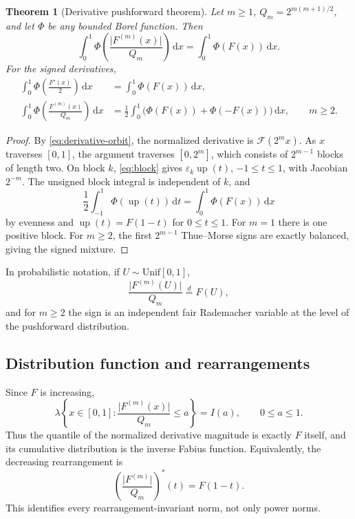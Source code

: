 \documentclass[11pt]{article}
\newtheorem{theorem}{Theorem}[section]
\theoremstyle{definition}
\theoremstyle{remark}
\DeclareMathOperator{\upf}{up}
\newcommand{\dd}{\,\mathrm d}
\newcommand{\FF}{\mathscr F}
\newcommand{\eps}{\varepsilon}
\newcommand{\abs}[1]{\lvert#1\rvert}
\newcommand{\set}[1]{\left\{#1\right\}}
\begin{document}
\begin{theorem}[Derivative pushforward theorem]
\label{thm:pushforward}
Let \(m\ge1\), \(Q_m=2^{m(m+1)/2}\), and let \(\Phi\) be any bounded Borel function.
Then
\begin{equation}
 \boxed{
 \int_0^1\Phi\!\left(\frac{\abs{F^{(m)}(x)}}{Q_m}\right)\dd x
 =\int_0^1\Phi(F(x))\dd x.
 }                                                        \label{eq:absolute-pushforward}
\end{equation}
For the signed derivatives,
\begin{align}
 \int_0^1\Phi\!\left(\frac{F'(x)}2\right)\dd x
 &=\int_0^1\Phi(F(x))\dd x,                              \label{eq:m1-pushforward}\\
 \int_0^1\Phi\!\left(\frac{F^{(m)}(x)}{Q_m}\right)\dd x
 &=\frac12\int_0^1\bigl(\Phi(F(x))+\Phi(-F(x))\bigr)\dd x,
 \qquad m\ge2.                                           \label{eq:signed-pushforward}
\end{align}
\end{theorem}

\begin{proof}
By \eqref{eq:derivative-orbit}, the normalized derivative is \(\FF(2^mx)\).  As
\(x\) traverses \([0,1]\), the argument traverses \([0,2^m]\), which consists of
\(2^{m-1}\) blocks of length two.  On block \(k\), \eqref{eq:block} gives
\(\eps_k\upf(t)\), \(-1\le t\le1\), with Jacobian \(2^{-m}\).  The unsigned block
integral is independent of \(k\), and
\[
 \frac12\int_{-1}^1\Phi(\upf(t))\dd t
 =\int_0^1\Phi(F(x))\dd x
\]
by evenness and \(\upf(t)=F(1-t)\) for \(0\le t\le1\).  For \(m=1\) there is one
positive block.  For \(m\ge2\), the first \(2^{m-1}\) Thue--Morse signs are exactly
balanced, giving the signed mixture.
\end{proof}

In probabilistic notation, if \(U\sim\mathrm{Unif}[0,1]\),
\begin{equation}
 \frac{\abs{F^{(m)}(U)}}{Q_m}\stackrel{d}{=}F(U),            \label{eq:distribution-law}
\end{equation}
and for \(m\ge2\) the sign is an independent fair Rademacher variable at the level of
the pushforward distribution.

\subsection{Distribution function and rearrangements}

Since \(F\) is increasing,
\begin{equation}
 \lambda\set{x\in[0,1]:\frac{\abs{F^{(m)}(x)}}{Q_m}\le a}
 =I(a),\qquad 0\le a\le1.                                \label{eq:derivative-cdf}
\end{equation}
Thus the quantile of the normalized derivative magnitude is exactly \(F\) itself, and
its cumulative distribution is the inverse Fabius function.  Equivalently, the decreasing
rearrangement is
\begin{equation}
 \left(\frac{\abs{F^{(m)}}}{Q_m}\right)^*(t)=F(1-t).     \label{eq:decreasing-rearrangement}
\end{equation}
This identifies every rearrangement-invariant norm, not only power norms.
\end{document}
